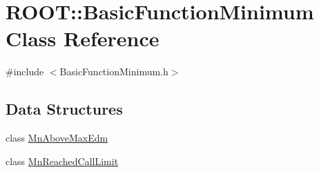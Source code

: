 \hypertarget{classROOT_1_1Minuit2_1_1BasicFunctionMinimum}{}\section{R\+O\+OT\+:\+:Basic\+Function\+Minimum Class Reference}
\label{classROOT_1_1Minuit2_1_1BasicFunctionMinimum}


{\ttfamily \#include $<$Basic\+Function\+Minimum.\+h$>$}

\subsection*{Data Structures}
\begin{DoxyCompactItemize}
\item 
class \mbox{\hyperlink{classROOT_1_1Minuit2_1_1BasicFunctionMinimum_1_1MnAboveMaxEdm}{Mn\+Above\+Max\+Edm}}
\item 
class \mbox{\hyperlink{classROOT_1_1Minuit2_1_1BasicFunctionMinimum_1_1MnReachedCallLimit}{Mn\+Reached\+Call\+Limit}}
\end{DoxyCompactItemize}
